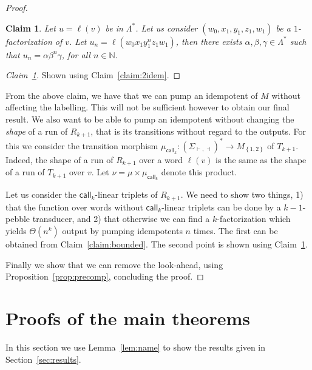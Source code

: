 \documentclass[sigplan,review,anonymous]{acmart}\settopmatter{printfolios=true,printccs=false,printacmref=false}
\newcommand{\set}[1]{\left\{#1 \right\}}
\newcommand{\nat}{\mathbb N}
\newcommand{\call}{\mathsf {call}}
\newtheorem{claim}[theorem]{Claim}
\theoremstyle{definition}
\theoremstyle{remark}
\begin{document}
\begin{proof}
    \begin{claim}\label{claim:pump}
        Let $u=\ell(v)$ be in $ \Lambda^*$.
        Let us consider $(w_0,x_1,y_1,z_1,w_1)$ be a $1$-factorization of $v$.
        Let $u_n=\ell(w_0x_1y_1^nz_1w_1)$, then there exists $\alpha,\beta,\gamma\in \Lambda^*$ such that $u_n=\alpha\beta^n\gamma$, for all $n\in \nat$.
    \end{claim}
\begin{proof}[Claim~\ref{claim:pump}]
    Shown using Claim~\ref{claim:2idem}.
\end{proof}
From the above claim, we have that we can pump an idempotent of $M$ without affecting the labelling.
This will not be sufficient however to obtain our final result. We also want to be able to pump an idempotent without changing the \emph{shape} of a run of $R_{k+1}$, that is its transitions without regard to the outputs.
For this we consider the transition morphism $\mu_{\call_k}:(\Sigma_{\vdash,\dashv})^*\rightarrow M_{\set{1,2}}$ of $T_{k+1}$. Indeed, the shape of a run of $R_{k+1}$ over a word $\ell(v)$ is the same as the shape of a run of $T_{k+1}$ over $v$.
Let $\nu=\mu\times \mu_{\call_k}$ denote this product.

Let us consider the ${\call_k}$-linear triplets of $R_{k+1}$.
We need to show two things, 1) that the function over words without ${\call_k}$-linear triplets can be done by a $k{-}1$-pebble transducer, and 2) that otherwise we can find a $k$-factorization which yields $\Theta(n^k)$ output by pumping idempotents $n$ times.
The first can be obtained from Claim~\ref{claim:bounded}. The second point is shown using Claim~\ref{claim:pump}.

Finally we show that we can remove the look-ahead, using Proposition~\ref{prop:precomp}, concluding the proof.
\end{proof}

\section{Proofs of the main theorems}
\label{sec:proofs}

In this section we use Lemma~\ref{lem:name} to show the results given in Section~\ref{sec:results}.
\onkthm*
\end{document}
